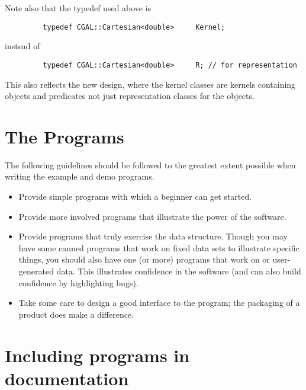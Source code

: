 \begin{itemize}
         Note also that the typedef used above is
         \begin{verbatim}
         typedef CGAL::Cartesian<double>     Kernel;
         \end{verbatim}
         instead of
         \begin{verbatim}
         typedef CGAL::Cartesian<double>     R; // for representation
         \end{verbatim}
         This also reflects the new design, where the kernel classes are
         kernels containing objects and predicates not just representation
         classes for the objects.
\end{itemize}

\section{The Programs}
\label{sec:ex_and_demo_content}

The following guidelines should be followed to the greatest extent possible
when writing the example and demo programs.
\begin{itemize}
   \item Provide simple programs with which a beginner can get started.
   \item Provide more involved programs that illustrate the power of the
         software.
   \item Provide programs that truly exercise the data structure.  Though you
         may have some canned programs that work on fixed data sets to 
         illustrate specific things, you should also have one (or more)
         programs that work on 
          or user-generated data. 
         This illustrates confidence in the software (and can also build
         confidence by highlighting bugs).
   \item Take some care to design a good interface to the program; 
         the packaging of a product does make a difference.
\end{itemize}

\section{Including programs in documentation}
\label{sec:programs_in_doc}

